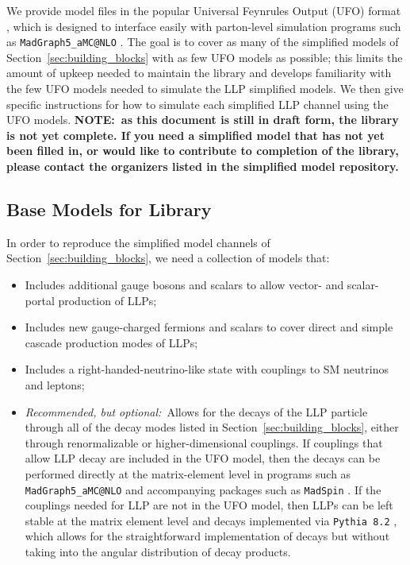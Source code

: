 We provide model files in the popular Universal Feynrules Output (UFO) format \cite{Degrande:2011ua}, which is designed to interface easily with parton-level simulation programs such as \texttt{MadGraph5\_aMC@}\texttt{NLO} \cite{Alwall:2014hca}. The goal is to cover as many of the simplified models of Section~\ref{sec:building_blocks} with as few UFO models as possible; this limits the amount of upkeep needed to maintain the library and develops familiarity with the few UFO models needed to simulate the LLP simplified models. We then give specific instructions for how to simulate each simplified LLP channel using the UFO models. {\bf NOTE:~as this document is still in draft form, the library is not yet complete. If you need a simplified model that has not yet been filled in, or would like to contribute to completion of the library, please contact the organizers listed in the simplified model repository.}

\subsection{Base Models for Library}\label{sec:base}

In order to reproduce the simplified model channels of Section~\ref{sec:building_blocks}, we need a collection of models that:
%
\begin{itemize}
\item Includes additional gauge bosons and scalars to allow vector- and scalar-portal production of LLPs;
\item Includes new gauge-charged fermions and scalars to cover direct and simple cascade production modes of LLPs;
\item Includes a right-handed-neutrino-like state with couplings to SM neutrinos and leptons;
\item \emph{Recommended, but optional:}~Allows for the decays of the LLP particle through all of the decay modes listed in Section~\ref{sec:building_blocks}, either through renormalizable or higher-dimensional couplings. If couplings that allow LLP decay are included in the UFO model, then the decays can be performed directly at the matrix-element level in programs such as \texttt{MadGraph5\_aMC@}\texttt{NLO} \cite{Alwall:2014hca} and accompanying packages such as \texttt{MadSpin} \cite{Artoisenet:2012st}. If the couplings needed for LLP are not in the UFO model, then LLPs can be left stable at the matrix element level and decays implemented via \texttt{Pythia 8.2} \cite{Sjostrand:2007gs,Sjostrand:2014zea}, which allows for the straightforward implementation of decays but without taking into the angular distribution of decay products.
\end{itemize}

